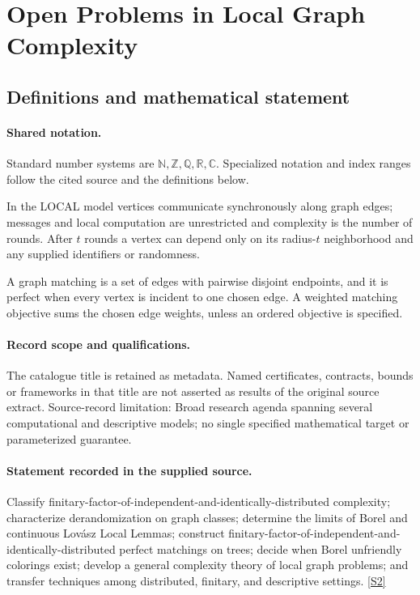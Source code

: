 \documentclass[11pt]{article}
\newcommand{\sref}[2]{\hyperlink{source:#1:#2}{[S#2]}}
\begin{document}
\section{Open Problems in Local Graph Complexity}\label{statement}

\subsection{Definitions and mathematical statement}

\paragraph{Shared notation.}Standard number systems are $\mathbb N,\mathbb Z,\mathbb Q,\mathbb R,\mathbb C$. Specialized notation and index ranges follow the cited source and the definitions below.


In the LOCAL model vertices communicate synchronously along graph edges; messages and local computation are unrestricted and complexity is the number of rounds. After $t$ rounds a vertex can depend only on its radius-$t$ neighborhood and any supplied identifiers or randomness.

A graph matching is a set of edges with pairwise disjoint endpoints, and it is perfect when every vertex is incident to one chosen edge. A weighted matching objective sums the chosen edge weights, unless an ordered objective is specified.
\paragraph{Record scope and qualifications.}
The catalogue title is retained as metadata. Named certificates, contracts, bounds or frameworks in that title are not asserted as results of the original source extract.
Source-record limitation: Broad research agenda spanning several computational and descriptive models; no single specified mathematical target or parameterized guarantee.
\paragraph{Statement recorded in the supplied source.}
Classify finitary-factor-of-independent-and-identically-distributed complexity; characterize derandomization on graph classes; determine the limits of Borel and continuous Lovász Local Lemmas; construct finitary-factor-of-independent-and-identically-distributed perfect matchings on trees; decide when Borel unfriendly colorings exist; develop a general complexity theory of local graph problems; and transfer techniques among distributed, finitary, and descriptive settings. \sref{statement}{2}
\end{document}
